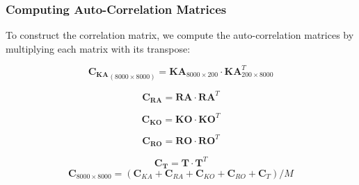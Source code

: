\documentclass[9pt,xcolor=dvipsnames]{beamer}
\begin{document}
\begin{frame}[fragile]
    \frametitle{Computing Auto-Correlation Matrices}

    To construct the correlation matrix, we compute the auto-correlation matrices by multiplying each matrix with its transpose:

    \[
    \mathbf{C_{KA}}_{(8000 \times 8000)} = \mathbf{KA}_{8000\times 200} \cdot \mathbf{KA}^T_{200 \times 8000}
    \]

    \[
    \mathbf{C_{RA}} = \mathbf{RA} \cdot \mathbf{RA}^T
    \]

    \[
    \mathbf{C_{KO}} = \mathbf{KO} \cdot \mathbf{KO}^T
    \]

    \[
    \mathbf{C_{RO}} = \mathbf{RO} \cdot \mathbf{RO}^T
    \]

    \[
    \mathbf{C_T} = \mathbf{T} \cdot \mathbf{T}^T
    \]
 \begin{equation*}
    \boxed{ \mathbf{C}_{8000 \times 8000}=(\mathbf{C}_{KA}+\mathbf{C}_{RA}+\mathbf{C}_{KO}+\mathbf{C}_{RO}+\mathbf{C}_{T})/M}
 \end{equation*}   
\end{frame}
\end{document}
